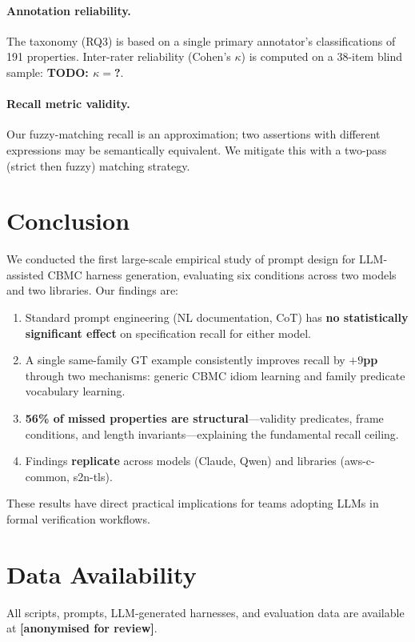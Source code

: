 \documentclass[review]{elsarticle}
\begin{document}
\paragraph{Annotation reliability.} The taxonomy (RQ3) is based on a single
primary annotator's classifications of 191 properties.
Inter-rater reliability (Cohen's $\kappa$) is computed on a 38-item blind
sample: \textbf{TODO: $\kappa = $?}.

\paragraph{Recall metric validity.} Our fuzzy-matching recall is an approximation;
two assertions with different expressions may be semantically equivalent.
We mitigate this with a two-pass (strict then fuzzy) matching strategy.

\section{Conclusion}
\label{sec:conclusion}

We conducted the first large-scale empirical study of prompt design for
LLM-assisted CBMC harness generation, evaluating six conditions across two
models and two libraries. Our findings are:

\begin{enumerate}
  \item Standard prompt engineering (NL documentation, CoT) has \textbf{no
        statistically significant effect} on specification recall for either model.
  \item A single same-family GT example consistently improves recall by \textbf{$+9$pp}
        through two mechanisms: generic CBMC idiom learning and family predicate
        vocabulary learning.
  \item \textbf{56\% of missed properties are structural}---validity predicates,
        frame conditions, and length invariants---explaining the fundamental recall
        ceiling.
  \item Findings \textbf{replicate} across models (Claude, Qwen) and libraries
        (aws-c-common, s2n-tls).
\end{enumerate}

\noindent These results have direct practical implications for teams adopting LLMs
in formal verification workflows.

\section*{Data Availability}

All scripts, prompts, LLM-generated harnesses, and evaluation data are available
at \textbf{[anonymised for review]}.


\end{document}
